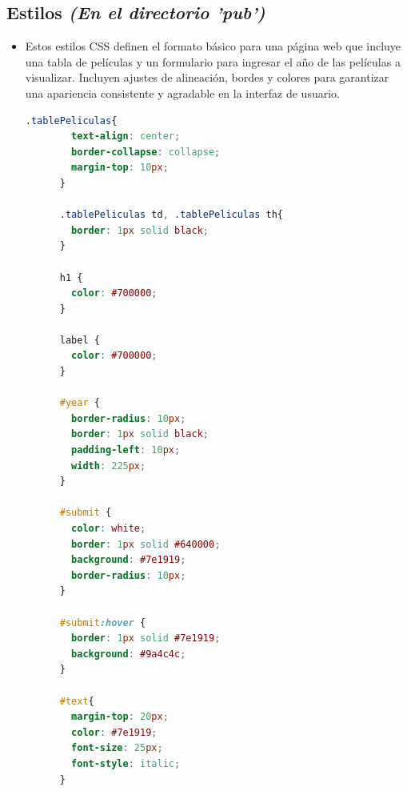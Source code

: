 \documentclass{article}
\begin{document}
  \subsection{Estilos \textit{(En el directorio 'pub')}}
  \begin{itemize}
    \item Estos estilos CSS definen el formato básico para una página web que incluye una tabla de películas 
      y un formulario para ingresar el año de las películas a visualizar. Incluyen ajustes de alineación, bordes 
      y colores para garantizar una apariencia consistente y agradable en la interfaz de usuario.
    \begin{lstlisting}[language=CSS,caption=Estilos]
      .tablePeliculas{
        text-align: center;
        border-collapse: collapse;
        margin-top: 10px;
      }

      .tablePeliculas td, .tablePeliculas th{
        border: 1px solid black;
      }

      h1 {
        color: #700000;
      }

      label {
        color: #700000;
      }

      #year {
        border-radius: 10px;
        border: 1px solid black;
        padding-left: 10px;
        width: 225px;
      }

      #submit {
        color: white;
        border: 1px solid #640000;
        background: #7e1919;
        border-radius: 10px;
      }

      #submit:hover {
        border: 1px solid #7e1919;
        background: #9a4c4c;
      }

      #text{
        margin-top: 20px;
        color: #7e1919;
        font-size: 25px;
        font-style: italic;
      }
    \end{lstlisting}
  \end{itemize}

\end{document}
